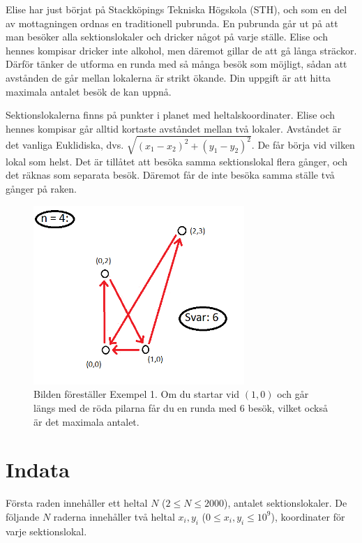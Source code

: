 \noindent

Elise har just börjat på Stackköpings Tekniska Högskola (STH), och som en del av mottagningen ordnas en traditionell pubrunda.
En pubrunda går ut på att man besöker alla sektionslokaler och dricker något på varje ställe.
Elise och hennes kompisar dricker inte alkohol, men däremot gillar de att gå långa sträckor.
Därför tänker de utforma en runda med så många besök som möjligt, sådan att avstånden de går mellan lokalerna är strikt ökande.
Din uppgift är att hitta maximala antalet besök de kan uppnå.

Sektionslokalerna finns på punkter i planet med heltalskoordinater.
Elise och hennes kompisar går alltid kortaste avståndet mellan två lokaler.
Avståndet är det vanliga Euklidiska, dvs. $\sqrt{(x_1 - x_2)^2 + (y_1 - y_2)^2}$.
De får börja vid vilken lokal som helst.
Det är tillåtet att besöka samma sektionslokal flera gånger, och det räknas som separata besök.
Däremot får de inte besöka samma ställe två gånger på raken.

\begin{figure}[!h]
\begin{center}
\includegraphics[width=8cm]{pubsequence.png}
\end{center}
\caption{Bilden föreställer Exempel 1. Om du startar vid $(1,0)$ och går längs med de röda pilarna får du en runda med $6$ besök, vilket också är det maximala antalet.}
\end{figure}

\section*{Indata}
Första raden innehåller ett heltal $N$ ($2 \leq N \leq 2000$), antalet sektionslokaler.
De följande $N$ raderna innehåller två heltal $x_i, y_i$ ($0 \leq x_i, y_i \leq 10^9$), koordinater för varje sektionslokal.

